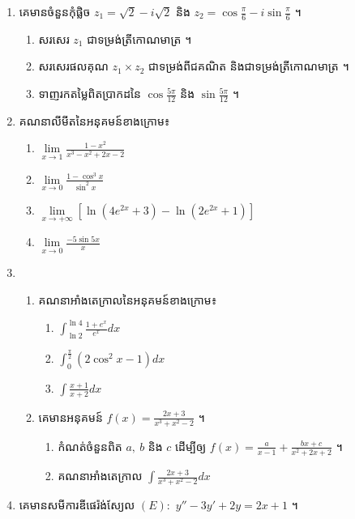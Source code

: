 \documentclass[a4paper, 11pt]{exam}
\begin{document}
\begin{enumerate}[I]
	\item គេមានចំនួនកុំផ្លិច $z_1=\sqrt{2}-i\sqrt{2}$ និង $z_2=\cos\frac{\pi}{6}-i\sin\frac{\pi}{6}$ ។
	\begin{enumerate}[a]
		\item សរសេរ $z_1$ ជាទម្រង់ត្រីកោណមាត្រ ។
		\item សរសេរផលគុណ $z_1\times z_2$ ជាទម្រង់ពីជគណិត និងជាទម្រង់ត្រីកោណមាត្រ ។
		\item ទាញរកតម្លៃពិតប្រាកដនៃ $\cos\frac{5\pi}{12}$ និង $\sin\frac{5\pi}{12}$ ។
	\end{enumerate}
	\item គណនាលីមីតនៃអនុគមន៍ខាងក្រោម៖
	\begin{multicols}{2}
		\begin{enumerate}[a]
			\item $\lim\limits_{x\to1} \frac{1-x^2}{x^3-x^2+2x-2}$
			\item $\lim\limits_{x\to 0} \frac{1-\cos^3x}{\sin^2x}$
			\item $\lim\limits_{x\to+\infty} \left[\ln(4e^{2x}+3)-\ln(2e^{2x}+1)\right]$
			\item $\lim\limits_{x\to0} \frac{-5\sin5x}{x}$
		\end{enumerate}
	\end{multicols}
	\item \begin{enumerate}[1]
		\item គណនាអាំងតេក្រាលនៃអនុគមន៍ខាងក្រោម៖
		\begin{multicols}{3}
			\begin{enumerate}[a]
				\item $\int_{\ln2}^{\ln4}\frac{1+e^x}{e^x}dx$
				\item $\int_{0}^{\frac{\pi}{2}} (2\cos^2x-1)dx$
				\item $\int \frac{x+1}{x+2}dx$
			\end{enumerate}
		\end{multicols}
		\item គេមានអនុគមន៍ $f(x)=\frac{2x+3}{x^3+x^2-2}$ ។
		\begin{enumerate}[a]
			\item កំណត់ចំនួនពិត $a, ~b$ និង $c$ ដើម្បីឲ្យ $f(x)=\frac{a}{x-1}+\frac{bx+c}{x^2+2x+2}$ ។
			\item គណនាអាំងតេក្រាល $\int \frac{2x+3}{x^3+x^2-2} dx$ 
		\end{enumerate}
	\end{enumerate}
	\item គេមានសមីការឌីផេរ៉ង់ស្យែល $(E):$ $y''-3y'+2y = 2x+1$ ។

\end{enumerate}
\end{document}
